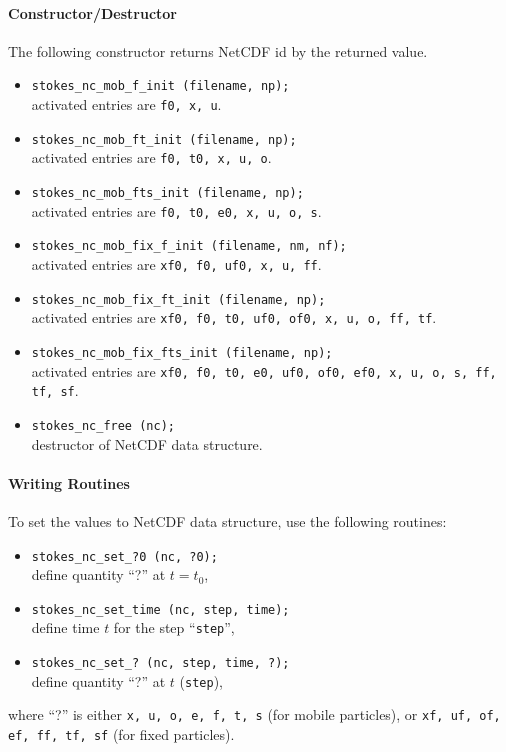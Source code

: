 \documentclass{book}
\begin{document}
\paragraph{Constructor/Destructor}
The following constructor returns NetCDF id by the returned value.
\begin{itemize}
\item {\tt stokes\_nc\_mob\_f\_init (filename, np);}\\
  activated entries are {\tt f0, x, u}.
\item {\tt stokes\_nc\_mob\_ft\_init (filename, np);}\\
  activated entries are {\tt f0, t0, x, u, o}.
\item {\tt stokes\_nc\_mob\_fts\_init (filename, np);}\\
  activated entries are {\tt f0, t0, e0, x, u, o, s}.
\item {\tt stokes\_nc\_mob\_fix\_f\_init (filename, nm, nf);}\\
  activated entries are {\tt xf0, f0, uf0, x, u, ff}.
\item {\tt stokes\_nc\_mob\_fix\_ft\_init (filename, np);}\\
  activated entries are {\tt xf0, f0, t0, uf0, of0, x, u, o, ff, tf}.
\item {\tt stokes\_nc\_mob\_fix\_fts\_init (filename, np);}\\
  activated entries are {\tt xf0, f0, t0, e0, uf0, of0, ef0,
  x, u, o, s, ff, tf, sf}.
\item {\tt stokes\_nc\_free (nc);}\\
  destructor of NetCDF data structure.
\end{itemize}


\paragraph{Writing Routines}
To set the values to NetCDF data structure,
use the following routines:
\begin{itemize}
\item {\tt stokes\_nc\_set\_?0 (nc, ?0);}\\
    define quantity ``?'' at $t=t_0$,
\item {\tt stokes\_nc\_set\_time (nc, step, time);}\\
    define time $t$ for the step ``{\tt step}'',
\item {\tt stokes\_nc\_set\_? (nc, step, time, ?);}\\
    define quantity ``?'' at $t$ ({\tt step}),
\end{itemize}
where ``?'' is either
{\tt x, u, o, e, f, t, s} (for mobile particles), or
{\tt xf, uf, of, ef, ff, tf, sf} (for fixed particles).
\end{document}
